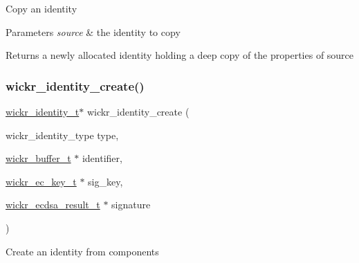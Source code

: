 Copy an identity


\begin{DoxyParams}{Parameters}
{\em source} & the identity to copy \\
\hline
\end{DoxyParams}
\begin{DoxyReturn}{Returns}
a newly allocated identity holding a deep copy of the properties of \textquotesingle{}source\textquotesingle{} 
\end{DoxyReturn}
\mbox{\label{group__wickr__identity_ga75bfef275a250a32784231e8c042913b}} 
\subsubsection{\texorpdfstring{wickr\+\_\+identity\+\_\+create()}{wickr\_identity\_create()}}
{\footnotesize\ttfamily \mbox{\hyperlink{structwickr__identity}{wickr\+\_\+identity\+\_\+t}}$\ast$ wickr\+\_\+identity\+\_\+create (\begin{DoxyParamCaption}\item[{wickr\+\_\+identity\+\_\+type}]{type,  }\item[{\mbox{\hyperlink{structwickr__buffer}{wickr\+\_\+buffer\+\_\+t}} $\ast$}]{identifier,  }\item[{\mbox{\hyperlink{structwickr__ec__key}{wickr\+\_\+ec\+\_\+key\+\_\+t}} $\ast$}]{sig\+\_\+key,  }\item[{\mbox{\hyperlink{structwickr__ecdsa__result}{wickr\+\_\+ecdsa\+\_\+result\+\_\+t}} $\ast$}]{signature }\end{DoxyParamCaption})}

Create an identity from components


